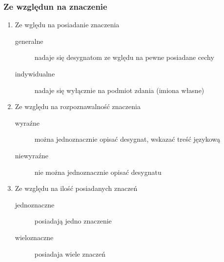 \documentclass[11pt]{article}
\begin{document}
\subsubsection{Ze względun na znaczenie}
\label{sec:org6754b16}

\begin{enumerate}
\item Ze wględu na posiadanie znaczenia
\label{sec:org1090f28}

\begin{description}
\item[{generalne}] nadaje się desygnatom ze wględu na pewne posiadane cechy
\item[{indywidualne}] nadaje się wyłącznie na podmiot zdania (imiona własne)
\end{description}

\item Ze względu na rozpoznawalność znaczenia
\label{sec:orgd8d37da}

\begin{description}
\item[{wyraźne}] można jednoznacznie opisać desygnat, wskazać treść językową
\item[{niewyraźne}] nie można jednoznacznie opisać desygnatu
\end{description}


\item Ze względu na ilość posiadanych znaczeń
\label{sec:org3614bdb}

\begin{description}
\item[{jednoznaczne}] posiadają jedno znaczenie
\item[{wieloznaczne}] posiadaja wiele znaczeń
\end{description}
\end{enumerate}
\end{document}
